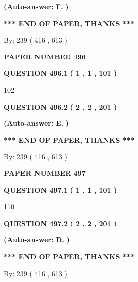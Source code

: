 \documentclass[12pt]{article}
\begin{document}
 
{\textbf{(Auto-answer:}}
{\textbf{\large{
F.}}}
{\textbf{)}}
 
 
   
   
   
   
\vspace{1.0in} 
{\textbf{\large{ *** END OF PAPER, THANKS *** }}} 
   
   
\hspace{1.0in} By: 
 239 ( 416 ,  613 )
   
   
   
   
\newpage 
\setcounter{page}{ 
   496001 } 
   
   
 {\textbf{ \Large{ PAPER NUMBER  496  }}}
   
   
   
   
  
  
{\textbf{\large{QUESTION
496.1 
 ( 1 , 1 , 101 )
}}}

102
  
  
{\textbf{\large{QUESTION
496.2 
 ( 2 , 2 , 201 )
}}}
 
 
{\textbf{(Auto-answer:}}
{\textbf{\large{
E.}}}
{\textbf{)}}
 
 
   
   
   
   
\vspace{1.0in} 
{\textbf{\large{ *** END OF PAPER, THANKS *** }}} 
   
   
\hspace{1.0in} By: 
 239 ( 416 ,  613 )
   
   
   
   
\newpage 
\setcounter{page}{ 
   497001 } 
   
   
 {\textbf{ \Large{ PAPER NUMBER  497  }}}
   
   
   
   
  
  
{\textbf{\large{QUESTION
497.1 
 ( 1 , 1 , 101 )
}}}

110
  
  
{\textbf{\large{QUESTION
497.2 
 ( 2 , 2 , 201 )
}}}
 
 
{\textbf{(Auto-answer:}}
{\textbf{\large{
D.}}}
{\textbf{)}}
 
 
   
   
   
   
\vspace{1.0in} 
{\textbf{\large{ *** END OF PAPER, THANKS *** }}} 
   
   
\hspace{1.0in} By: 
 239 ( 416 ,  613 )
   
   
   
\end{document}
